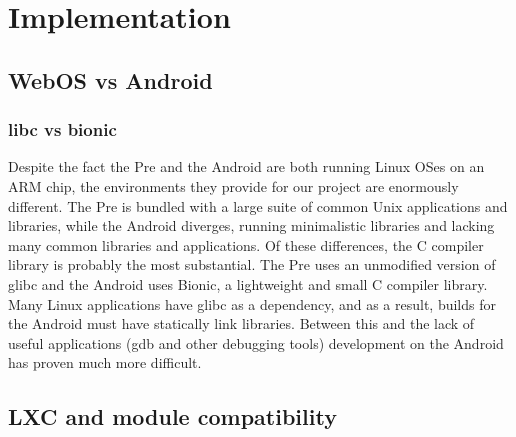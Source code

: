 \section{Implementation}
\label{sec:impl}

\subsection{WebOS vs Android}
\subsubsection{libc vs bionic}
Despite the fact the Pre and the Android are both running Linux OSes on an ARM chip, the environments they provide for our project are enormously different.  The Pre is bundled with a large suite of common Unix applications and libraries, while the Android diverges, running minimalistic libraries and lacking many common libraries and applications.  Of these differences, the C compiler library is probably the most substantial. The Pre uses an unmodified version of glibc and the Android uses Bionic, a lightweight and small C compiler library.  Many Linux applications have glibc as a dependency, and as a result, builds for the Android must have statically link libraries.  Between this and the lack of useful applications (gdb and other debugging tools) development on the Android has proven much more difficult.  

\subsection{LXC and module compatibility}

